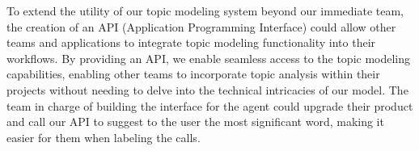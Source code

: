 To extend the utility of our topic modeling system beyond our immediate team, the creation of an API (Application Programming Interface) could allow other teams and applications to integrate topic modeling functionality into their workflows. By providing an API, we enable seamless access to the topic modeling capabilities, enabling other teams to incorporate topic analysis within their projects without needing to delve into the technical intricacies of our model. The team in charge of building the interface for the agent could upgrade their product and call our API to suggest to the user the most significant word, making it easier for them when labeling the calls.
